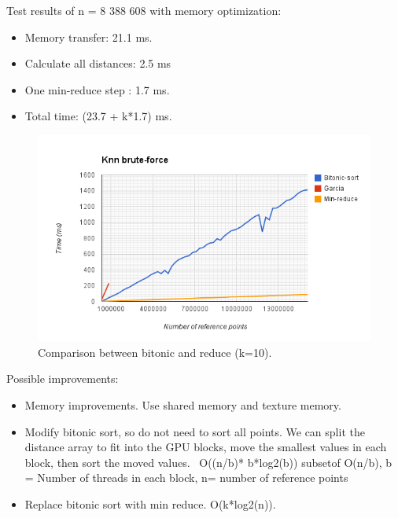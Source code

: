 Test results of n = 8 388 608 with memory optimization:
\begin{itemize}
    \item Memory transfer:  21.1 ms.
    \item Calculate all distances: 2.5 ms
    \item One min-reduce step : 1.7 ms.
    \item Total time: (23.7 + k*1.7) ms.
\end{itemize}

\begin{figure}[ht!]
\centering
\includegraphics[width=120mm]{../gfx/BitonicVSreduce.png}

\caption{Comparison between bitonic and reduce (k=10).}
\label{fig:bitonic_vs_reduce}
\end{figure}

Possible improvements:

\begin{itemize}
    \item Memory improvements. Use shared memory and texture memory.
    \item Modify bitonic sort, so do not need to sort all points. We can split the distance array to fit into the GPU blocks, move the smallest values in each block, then sort the moved values. ~O((n/b)* b*log2(b)) subsetof O(n/b), b = Number of threads in each block, n= number of reference points
    \item Replace bitonic sort with min reduce. O(k*log2(n)).
\end{itemize}


